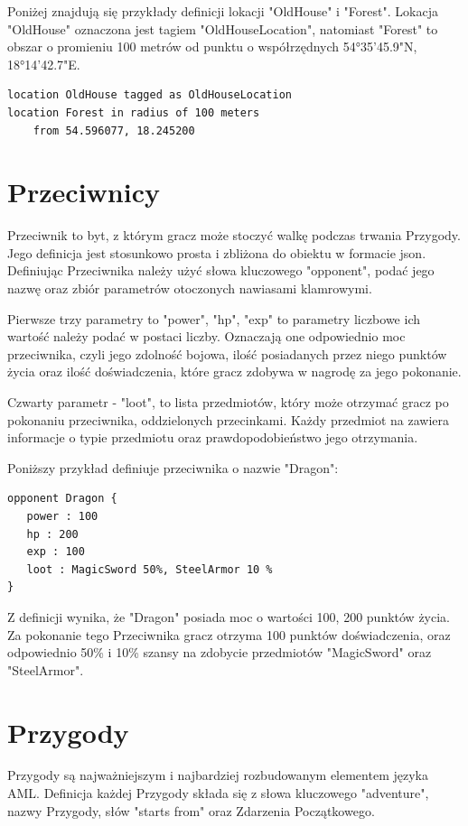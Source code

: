 \documentclass{xmgr}
\begin{document}
Poniżej znajdują się przykłady definicji lokacji "OldHouse" i "Forest". Lokacja "OldHouse" oznaczona jest tagiem "OldHouseLocation", natomiast "Forest" to obszar o promieniu 100 metrów od punktu o współrzędnych 54°35'45.9"N, 18°14'42.7"E.
\begin{lstlisting}
location OldHouse tagged as OldHouseLocation
location Forest in radius of 100 meters 
	from 54.596077, 18.245200
\end{lstlisting}

\section{Przeciwnicy}

Przeciwnik to byt, z którym gracz może stoczyć walkę podczas trwania Przygody. Jego definicja jest stosunkowo prosta i zbliżona do obiektu w formacie json. Definiując Przeciwnika należy użyć słowa kluczowego "opponent", podać jego nazwę oraz zbiór parametrów otoczonych nawiasami klamrowymi.

Pierwsze trzy parametry to "power", "hp", "exp" to parametry liczbowe ich wartość należy podać w postaci liczby. Oznaczają one odpowiednio moc przeciwnika, czyli jego zdolność bojowa, ilość posiadanych przez niego punktów życia oraz ilość doświadczenia, które gracz zdobywa w nagrodę za jego pokonanie.

Czwarty parametr - "loot", to lista przedmiotów, który może otrzymać gracz po pokonaniu przeciwnika, oddzielonych przecinkami. Każdy przedmiot na zawiera informacje o typie przedmiotu oraz prawdopodobieństwo jego otrzymania.

Poniższy przykład definiuje przeciwnika o nazwie "Dragon":

\begin{lstlisting}
opponent Dragon {
   power : 100
   hp : 200
   exp : 100
   loot : MagicSword 50%, SteelArmor 10 %
}
\end{lstlisting}

Z definicji wynika, że "Dragon" posiada moc o wartości 100, 200 punktów życia. Za pokonanie tego Przeciwnika gracz otrzyma 100 punktów doświadczenia, oraz odpowiednio 50\% i 10\% szansy na zdobycie przedmiotów "MagicSword" oraz "SteelArmor".

\section{Przygody}
Przygody są najważniejszym i najbardziej rozbudowanym elementem języka AML. Definicja każdej Przygody składa się z słowa kluczowego "adventure", nazwy Przygody, słów "starts from" oraz Zdarzenia Początkowego.
\end{document}
